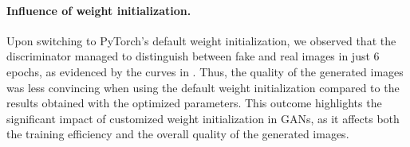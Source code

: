\paragraph*{Influence of weight initialization.}
Upon switching to PyTorch's default weight initialization, we observed that the discriminator managed to distinguish between fake and real images in just 6 epochs, as evidenced by the curves in . Thus, the quality of the generated images was less convincing when using the default weight initialization compared to the results obtained with the optimized parameters. This outcome highlights the significant impact of customized weight initialization in GANs, as it affects both the training efficiency and the overall quality of the generated images.

\begin{figure}[H]
    \centering


\end{figure}
